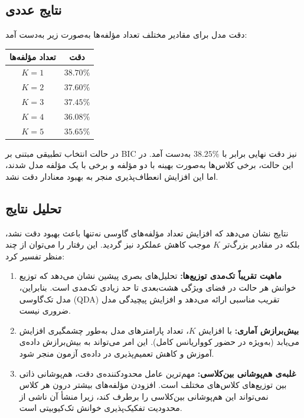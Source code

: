 \subsection{نتایج عددی}

دقت مدل برای مقادیر مختلف تعداد مؤلفه‌ها به‌صورت زیر به‌دست آمد:

\begin{center}
	\begin{tabular}{c c}
		\hline
		تعداد مؤلفه‌ها & دقت \\
		\hline
		$K=1$ & $38.70\%$ \\
		$K=2$ & $37.60\%$ \\
		$K=3$ & $37.45\%$ \\
		$K=4$ & $36.08\%$ \\
		$K=5$ & $35.65\%$ \\
		\hline
	\end{tabular}
\end{center}

در حالت انتخاب تطبیقی مبتنی بر BIC نیز دقت نهایی برابر با $38.25\%$ به‌دست آمد. در این حالت، برخی کلاس‌ها به‌صورت بهینه با دو مؤلفه و برخی با یک مؤلفه مدل شدند، اما این افزایش انعطاف‌پذیری منجر به بهبود معنادار دقت نشد.

\subsection{تحلیل نتایج}

نتایج نشان می‌دهد که افزایش تعداد مؤلفه‌های گاوسی نه‌تنها باعث بهبود دقت نشد، بلکه در مقادیر بزرگ‌تر $K$ موجب کاهش عملکرد نیز گردید. این رفتار را می‌توان از چند منظر تفسیر کرد:

\begin{enumerate}
	\item \textbf{ماهیت تقریباً تک‌مدی توزیع‌ها:} تحلیل‌های بصری پیشین نشان می‌دهد که توزیع خوانش هر حالت در فضای ویژگی هشت‌بعدی تا حد زیادی تک‌مدی است. بنابراین، مدل تک‌گاوسی (QDA) تقریب مناسبی ارائه می‌دهد و افزایش پیچیدگی مدل ضروری نیست.
	
	\item \textbf{بیش‌برازش آماری:} با افزایش $K$، تعداد پارامترهای مدل به‌طور چشمگیری افزایش می‌یابد (به‌ویژه در حضور کوواریانس کامل). این امر می‌تواند به بیش‌برازش داده‌ی آموزش و کاهش تعمیم‌پذیری در داده‌ی آزمون منجر شود.
	
	\item \textbf{غلبه‌ی هم‌پوشانی بین‌کلاسی:} مهم‌ترین عامل محدودکننده‌ی دقت، هم‌پوشانی ذاتی بین توزیع‌های کلاس‌های مختلف است. افزودن مؤلفه‌های بیشتر درون هر کلاس نمی‌تواند این هم‌پوشانی بین‌کلاسی را برطرف کند، زیرا منشأ آن ناشی از محدودیت تفکیک‌پذیری خوانش تک‌کیوبیتی است.
\end{enumerate}

